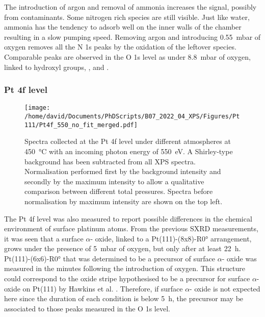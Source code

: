 The introduction of argon and removal of ammonia increases the  signal, possibly from contaminants.
Some nitrogen rich species are still visible.
Just like water, ammonia has the tendency to adsorb well on the inner walls of the chamber resulting in a slow pumping speed.
Removing argon and introducing \qty{0.55}{\milli\bar} of oxygen removes all the N 1s peaks by the oxidation of the leftover  species.
Comparable peaks are observed in the O 1s level as under \qty{8.8}{\milli\bar} of oxygen, linked to hydroxyl groups, , and .

\subsubsection{Pt 4f level}

\begin{figure}[!htb]
    \centering
    \texttt{[image: /home/david/Documents/PhDScripts/B07\_2022\_04\_XPS/Figures/Pt111/Pt4f\_550\_no\_fit\_merged.pdf]}
    \caption{
        Spectra collected at the Pt 4f level under different atmospheres at \qty{450}{\degreeCelsius} with an incoming photon energy of \qty{550}{\eV}.
        A Shirley-type background has been subtracted from all XPS spectra.
        Normalisation performed first by the background intensity and secondly by the maximum intensity to allow a qualitative comparison between different total pressures.
        Spectra before normalisation by maximum intensity are shown on the top left.
    }
    \label{fig:Pt4fPt111}
\end{figure}


The Pt 4f level was also measured to report possible differences in the chemical environment of surface platinum atoms.
From the previous SXRD measurements, it was seen that a surface $\alpha$- oxide, linked to a Pt(111)-(8x8)-R\ang{0} arrangement, grows under the presence of \qty{5}{\milli\bar} of oxygen, but only after at least \qty{22}{\hour}.
Pt(111)-(6x6)-R\ang{0} that was determined to be a precursor of surface $\alpha$- oxide was measured in the minutes following the introduction of oxygen.
This structure could correspond to the oxide stripe hypothesised to be a precursor for surface $\alpha$- oxide on Pt(111) by Hawkins et al. \parencite*{Hawkins2009}.
Therefore, if surface $\alpha$- oxide is not expected here since the duration of each condition is below \qty{5}{\hour}, the precursor may be associated to those peaks measured in the O 1s level.

